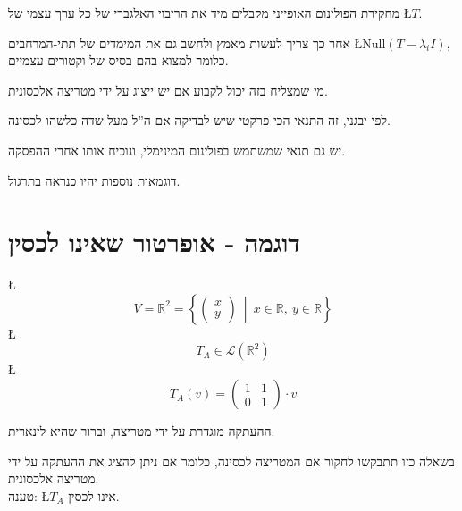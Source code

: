 \documentclass[english,hebrew]{article}
\begin{document}
מחקירת הפולינום האופייני מקבלים מיד את הריבוי האלגברי של כל ערך עצמי
של \L{$T$}. 

אחר כך צריך לעשות מאמץ ולחשב גם את המימדים של תתי-המרחבים \L{$\text{Null}(T-\lambda_{i}I)$},
כלומר למצוא בהם בסיס של וקטורים עצמיים.

מי שמצליח בזה יכול לקבוע אם יש ייצוג על ידי מטריצה אלכסונית.

לפי יבגני, זה התנאי הכי פרקטי שיש לבדיקה אם ה\textquotedblright ל
מעל שדה כלשהו לכסינה.

יש גם תנאי שמשתמש בפולינום המינימלי, ונוכיח אותו אחרי ההפסקה.

דוגמאות נוספות יהיו כנראה בתרגול.

\section{דוגמה - אופרטור שאינו לכסין}

\L{%
\[
V=\mathbb{R}^{2}=\left\{ \begin{pmatrix}x\\
y
\end{pmatrix}\ \middle|\ x\in\mathbb{R},\ y\in\mathbb{R}\right\} 
\]
}%
\L{%
\[
T_{A}\in\mathcal{L}(\mathbb{R}^{2})
\]
}%
\L{%
\[
T_{A}(v)=\begin{pmatrix}1 & 1\\
0 & 1
\end{pmatrix}\cdot v
\]
}%

ההעתקה מוגדרת על ידי מטריצה, וברור שהיא לינארית. 

בשאלה כזו תתבקשו לחקור אם המטריצה לכסינה, כלומר אם ניתן להציג את ההעתקה
על ידי מטריצה אלכסונית.\\

טענה: \L{$T_{A}$} אינו לכסין.
\end{document}
